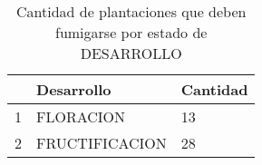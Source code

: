\begin{table}[ht]
\centering
\begin{tabular}{rll}
  \hline
 & Desarrollo & Cantidad \\ 
  \hline
1 & FLORACION & 13 \\ 
  2 & FRUCTIFICACION & 28 \\ 
   \hline
\end{tabular}
\caption{Cantidad de plantaciones que deben
             fumigarse por estado de DESARROLLO} 
\label{table:plantacionesAfumigar}
\end{table}
